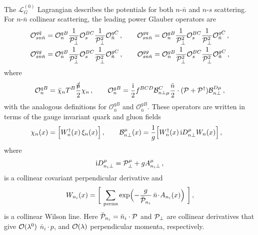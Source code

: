 \documentclass[letterpaper,11pt]{article}
\def\cB{\mathcal{B}}
\newcommand{\sdt}{\!\cdot\!}
\newcommand{\img}{\mathrm{i}}
\newcommand{\cL}{\mathcal{L}}
\newcommand{\cO}{\mathcal{O}}
\newcommand{\nn}{\nonumber}
\newcommand{\bn}{{\bar n}}
\newcommand{\bnP}{\bar {\cal P}}
\newcommand{\cP}{{\cal P}}
\newcommand{\Sl}[1]{\slashed{#1}}
\begin{document}
The $ \cL_G^{(0)}$ Lagrangian describes the potentials for both $n$-$\bar n$ and $n$-$s$ scattering. 
For $n$-$\bar n$ collinear scattering, the leading power Glauber operators are
\begin{align}\label{eq:nnops}
\cO^{q\bar q}_{sn\bar n} &= \cO_n^{qB} \frac{1}{\cP_\perp^2} \cO_s^{BC} \frac{1}{\cP_\perp^2} \cO_\bn^{qC}
 \,, \qquad    
\cO^{g q}_{sn\bar n} = \cO_n^{gB} \frac{1}{\cP_\perp^2} \cO_s^{BC} \frac{1}{\cP_\perp^2} \cO_\bn^{qC}
  \,, \nn \\
\cO^{qg}_{sn\bar n} &= \cO_n^{qB} \frac{1}{\cP_\perp^2} \cO_s^{BC} \frac{1}{\cP_\perp^2} \cO_\bn^{gC}
 \,, \qquad  
 \cO^{gg}_{sn\bar n} = \cO_n^{gB} \frac{1}{\cP_\perp^2} \cO_s^{BC} \frac{1}{\cP_\perp^2} \cO_\bn^{gC}
 \,,
\end{align}
where 
\begin{align} \label{eq:Onops}
\cO_n^{qB} = \bar \chi_n T^B \frac{\Sl{\bar n}}{2} \chi_n \,, \qquad \cO_n^{gB} = \frac{\img}{2} f^{BCD} \cB^C_{n\perp \mu} \frac{\bar n}{2} \cdot (\cP+\cP^\dagger ) \cB^{D\mu}_{n\perp}\,,
\end{align}
with the analogous definitions for $\cO_\bn^{qB}$ and $\cO_\bn^{gB}$. 
These operators are written in terms of the gauge invariant quark and gluon fields \cite{Bauer:2000yr,Bauer:2001ct}
\begin{align} \label{eq:chiB}
\chi_{{n}}(x) &= \Bigl[W_{n}^\dagger(x)\, \xi_{n}(x) \Bigr]
\,,\qquad 
\cB_{{n}\perp}^\mu(x)
= \frac{1}{g}\Bigl[ W_{n}^\dagger(x)\,\img  D_{n\perp}^\mu W_{n}(x)\Bigr]
 \,,
\end{align}
where
\begin{equation}
\img  D_{{n_i}\perp}^\mu = \cP^\mu_{\perp} + g A^\mu_{{n_i}\perp}\,,
\end{equation}
is a collinear covariant perpendicular derivative and
\begin{equation} \label{eq:Wn}
W_{n_i}(x) = \biggl[~\sum_\text{perms} \exp\Bigl(-\frac{g}{\bnP_{n_i}}\,\bn\sdt A_{n_i}(x)\Bigr)~\biggr]\,,
\end{equation}
is a collinear Wilson line. Here $\bnP_{n_i} = \bar n_i \cdot \cP$ and $\cP_\perp$ are collinear derivatives that give ${\cal O}(\lambda^0)$ $\bar n_i\cdot p$, and ${\cal O}(\lambda)$ perpendicular momenta, respectively.
\end{document}
